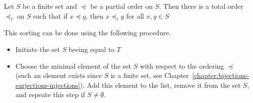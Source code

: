 \begin{theorem}
  Let $S$ be a finite set and $\preceq$ be a partial order on $S$. Then there is
  a total order $\preceq_t$ on $S$ such that if $x \preceq y$, then
  $x \preceq_t y$ for all $x, y \in S$
\end{theorem}

This sorting can be done using the following procedure.
\begin{itemize}
  \item Initiate the set $S$ beeing equal to $T$
  \item Choose the minimal element of the set $S$ with respect to the ordering
    $\preceq$ (such an element exists since $S$ is a finite set, see
    Chapter~\ref{chapter:bijections-surjections-injections}).
    Add this element to the list, remove it from the set $S$, and repeate this
    step if $S \neq \emptyset$.
\end{itemize}

